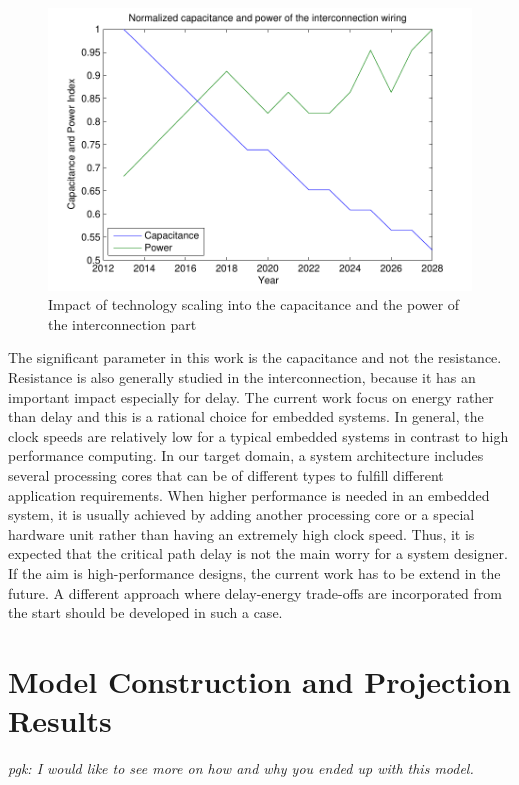  \begin{figure}
 \centering
 \includegraphics[width = \textwidth]{E/intpower.pdf}
  \caption{Impact of technology scaling into the capacitance and the power of the interconnection part}
 \label{fig:intpowerE}
 \end{figure}

The significant parameter in this work is the capacitance and not the resistance.
Resistance is also generally studied in the interconnection, because it has an important impact especially for
delay. 
The current work focus on energy rather than delay and this is a rational choice for embedded systems.
In general, the clock speeds are relatively low for a typical embedded systems in contrast to high performance computing.
In our target domain, a system architecture includes several processing cores that can be of different types to fulfill different application requirements.
When higher performance is needed in an embedded system, it is usually achieved by adding another processing core or a special hardware unit rather than having an extremely high clock speed.
Thus, it is expected that the critical path delay is not the main worry for a system designer.
If the aim is high-performance designs, the current work has to be extend in the future.
A different approach where delay-energy trade-offs are incorporated
from the start should be developed in such a case.

\section{Model Construction and Projection Results}
\label{resultsE}

\textit{pgk:  I would like to see more on how and why you ended up with this model.}

